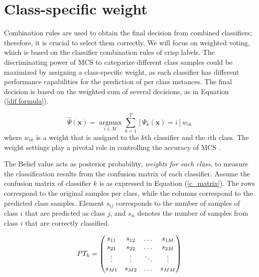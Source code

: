   

\section{Class-specific weight} \label{sec:4_3_beliefmethod}
Combination rules are used to obtain the final decision from combined classifiers; therefore, it is crucial to select them correctly. We will focus on weighted voting, which is based on the classifier combination rules of crisp labels. The discriminating power of MCS to categorize different class samples could be maximized by assigning a class-specific weight,  as each classifier has different performance capabilities for the prediction of per class instances. The final decision is based on the weighted sum of several decisions, as in Equation (\ref{dif.formula}).

\begin{equation}
\label{dif.formula}
\hat{\Psi}(\textbf{x})=\mathop{\arg\max}\limits_{i \in \mathcal{M}} \mathop{\sum}\limits_{k=1}^T \left[\Psi_k(\textbf{x})=i\right]w_{ik} \end{equation}
\noindent where $w_{ik}$ is a weight that is assigned to the $k$th classifier and the $i$th class. The weight settings play a pivotal role in controlling the accuracy of MCS  \cite{wozniak2008}.

 

The Belief value \cite{xu1992} acts as posterior probability, \textit{weights for each class}, to measure the classification results from the confusion matrix of each classifier. Assume the confusion matrix of classifier $k$ is as expressed in Equation (\ref{c_matrix}). The rows correspond to the original samples per class, while the columns correspond to the predicted class samples. Element $s_{ij}$ corresponds to the number of samples of class $i$ that are predicted as class $j$, and $s_{ii}$ denotes the number of samples from class $i$ that are correctly classified.

\begin{gather}
     \label{c_matrix}
  \begin{array}{l@{{}={}}c}
  PT_k & \left(\begin{array}{@{}cccc@{}}
    s_{11} & s_{12} & \dots & s_{1M} \\
    s_{21} & s_{22} & \dots & s_{2M} \\
    \vdots & \vdots & \ddots & \vdots \\
    s_{M1} & s_{M2} & \dots &s_{MM}
  \end{array}\right)
  \end{array} 
\end{gather}

